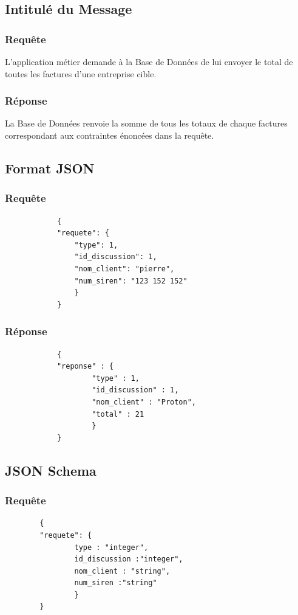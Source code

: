 \documentclass[a4paper, 11pt]{article}
\begin{document}
    \subsection{Intitulé du Message}
        \subsubsection{Requête} 
        L'application métier demande à la Base de Données de lui envoyer le total de toutes les factures d'une entreprise cible.
        \subsubsection{Réponse}
        La Base de Données renvoie la somme de tous les totaux de chaque factures correspondant aux contraintes énoncées dans la requête.
    \subsection{Format JSON}
        \subsubsection{Requête}
        \begin{verbatim}
            {
            "requete": {
                "type": 1,
                "id_discussion": 1,
                "nom_client": "pierre",
                "num_siren": "123 152 152"
                }
            }
        \end{verbatim}
        
        \subsubsection{Réponse}
        \begin{verbatim}
            {
            "reponse" : {
                    "type" : 1,
                    "id_discussion" : 1,
                    "nom_client" : "Proton",
                    "total" : 21
                    }
            }
        \end{verbatim}
    \subsection{JSON Schema}
        \subsubsection{Requête}
        \begin{verbatim}
        {
        "requete": {
                type : "integer",
                id_discussion :"integer",
                nom_client : "string",
                num_siren :"string"
                }
        }

        \end{verbatim}
        
\end{document}
